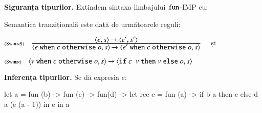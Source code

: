 \documentclass[addpoints,12pt,a4paper,answers]{exam}
\begin{document}
\begin{questions}
\vspace{-1ex}\question[3] \textbf{Siguranța tipurilor. }
Extindem sintaxa limbajului $\mathrel{\text{\ttfamily fun}}$-IMP cu:
\vspace{-1ex}\begin{syntaxBlock}{}
\end{syntaxBlock}

\vspace{-4ex}Semantica tranzițională este dată de următoarele reguli:

$\reg[SwhenS]{\Ss{\c{e \terminal{when} c \terminal{otherwise} o,s}}{\c{e' \terminal{when} c \terminal{otherwise} o,s}}}{\Ss{\c{e,s}}{\c{e',s'}}}{}$
și

$\reg[Swhen]{\Ss{\c{v \terminal{when} c \terminal{otherwise} o,s}}{\c{\terminal{if} c \terminal{} v \terminal{then} v \terminal{else} o,s}}}{}{}$


\question[3\half] \textbf{Inferența tipurilor. }
Se dă expresia $e$:
\begin{asciiml}
let a = fun (b) -> fun (c) -> fun(d) ->
          let rec e = fun (a) -> if b a then c else d a (e (a - 1))
          in  e
in a
\end{asciiml}
\end{questions}
\end{document}
